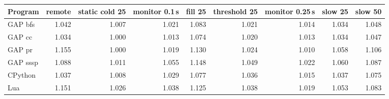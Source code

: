 \begin{tabular}{lrrrrrrrr}
\toprule
Program & remote & static cold 25 & monitor 0.1\,s & fill 25 & threshold 25 & monitor 0.25\,s & slow 25 & slow 50 \\
\midrule
GAP bfs & 1.042 & 1.007 & 1.021 & 1.083 & 1.021 & 1.014 & 1.034 & 1.048 \\
GAP cc & 1.034 & 1.000 & 1.013 & 1.074 & 1.020 & 1.013 & 1.034 & 1.047 \\
GAP pr & 1.155 & 1.000 & 1.019 & 1.130 & 1.024 & 1.010 & 1.058 & 1.106 \\
GAP sssp & 1.088 & 1.011 & 1.055 & 1.148 & 1.049 & 1.022 & 1.060 & 1.087 \\
CPython & 1.037 & 1.008 & 1.029 & 1.077 & 1.036 & 1.015 & 1.037 & 1.075 \\
Lua & 1.151 & 1.026 & 1.038 & 1.125 & 1.038 & 1.019 & 1.053 & 1.083 \\
\bottomrule
\end{tabular}
